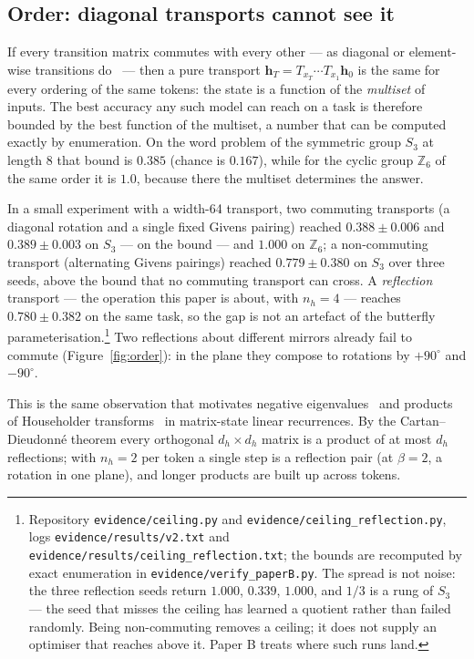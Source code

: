 \documentclass[10pt]{article}
\newcommand{\bh}{\mathbf{h}}
\begin{document}
\subsection{Order: diagonal transports cannot see it}

If every transition matrix commutes with every other --- as diagonal or element-wise transitions
do~\cite{gu2023mamba} --- then a pure transport $\bh_T = T_{x_T}\cdots T_{x_1}\bh_0$ is the same for every
ordering of the same tokens: the state is a function of the \emph{multiset} of inputs. The best accuracy
any such model can reach on a task is therefore bounded by the best function of the multiset, a number
that can be computed exactly by enumeration. On the word problem of the symmetric group $S_3$ at length 8
that bound is $0.385$ (chance is $0.167$), while for the cyclic group $\mathbb{Z}_6$ of the same order it is
$1.0$, because there the multiset determines the answer.

In a small experiment with a width-64 transport, two commuting transports (a diagonal rotation and a
single fixed Givens pairing) reached $0.388\pm0.006$ and $0.389\pm0.003$ on $S_3$ --- on the bound --- and
$1.000$ on $\mathbb{Z}_6$; a non-commuting transport (alternating Givens pairings) reached
$0.779\pm0.380$ on $S_3$ over three seeds, above the bound that no commuting transport can cross. A
\emph{reflection} transport --- the operation this paper is about, with $n_h=4$ --- reaches
$0.780\pm0.382$ on the same task, so the gap is not an artefact of the butterfly
parameterisation.\footnote{Repository \texttt{evidence/ceiling.py} and
\texttt{evidence/ceiling\_reflection.py}, logs \texttt{evidence/results/v2.txt} and
\texttt{evidence/results/ceiling\_reflection.txt}; the bounds are recomputed by exact enumeration in
\texttt{evidence/verify\_paperB.py}. The spread is not noise: the three reflection seeds return
$1.000$, $0.339$, $1.000$, and $1/3$ is a rung of $S_3$ --- the seed that misses the ceiling has
learned a quotient rather than failed randomly. Being non-commuting removes a ceiling; it does not
supply an optimiser that reaches above it. Paper B treats where such runs land.} Two reflections about different mirrors already fail to commute
(Figure~\ref{fig:order}): in the plane they compose to rotations by $+90^\circ$ and $-90^\circ$.

This is the same observation that motivates negative eigenvalues~\cite{grazzi2024} and products of
Householder transforms~\cite{siems2025} in matrix-state linear recurrences. By the Cartan--Dieudonn\'e
theorem every orthogonal $d_h\times d_h$ matrix is a product of at most $d_h$ reflections; with $n_h=2$ per
token a single step is a reflection pair (at $\beta=2$, a rotation in one plane), and longer products are
built up across tokens.
\end{document}
